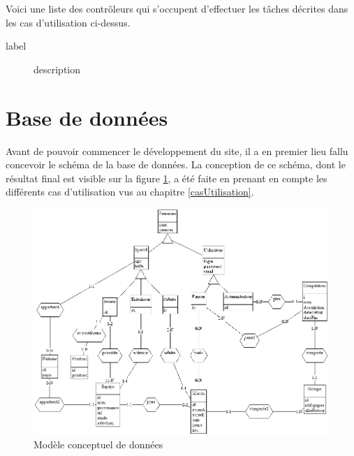 \documentclass[10pt,a4paper,titlepage]{article}
\begin{document}
Voici une liste des contrôleurs qui s'occupent d'effectuer les tâches décrites dans les cas d'utilisation ci-dessus.

\begin{description}
	\item[label] description
\end{description}

\section{Base de données}

Avant de pouvoir commencer le développement du site, il a en premier lieu fallu concevoir le schéma de la base de données. La conception de ce schéma, dont le résultat final est visible sur la figure \ref{MDC}, a été faite en prenant en compte les différents cas d'utilisation vus au chapitre \ref{casUtilisation}.\\
\begin{figure}[!h]
	\begin{center}
			\includegraphics[width=12cm]{imgs/MDC.png}
			\caption{Modèle conceptuel de données}
			\label{MDC}
	\end{center}
\end{figure}
\end{document}
